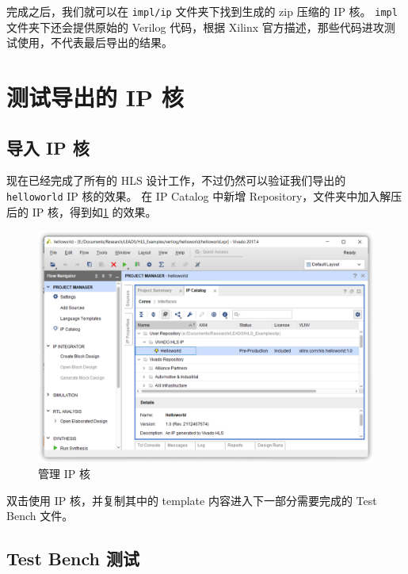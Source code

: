 \documentclass[English,Chinese,French,JP,TC,use boldface,simple name]{beaulivre}
\begin{document}
    完成之后，我们就可以在 \texttt{impl/ip} 文件夹下找到生成的 zip 压缩的 IP 核。
    \texttt{impl} 文件夹下还会提供原始的 Verilog 代码，根据 Xilinx 官方描述，那些代码进攻测试使用，不代表最后导出的结果。

  \section{测试导出的 IP 核}

    \subsection{导入 IP 核}

      现在已经完成了所有的 HLS 设计工作，不过仍然可以验证我们导出的 \texttt{helloworld} IP 核的效果。
      在 IP Catalog 中新增 Repository，文件夹中加入解压后的 IP 核，得到如\cref{fig:manage_ip} 的效果。
      \begin{figure}[htbp]
        \centering
        \includegraphics[width=.8\linewidth]{win/helloworld/manage_ip.png}
        \caption{管理 IP 核}
        \label{fig:manage_ip}
      \end{figure}

      双击使用 IP 核，并复制其中的 template 内容进入下一部分需要完成的 Test Bench 文件。

    \subsection{Test Bench 测试}
\end{document}

